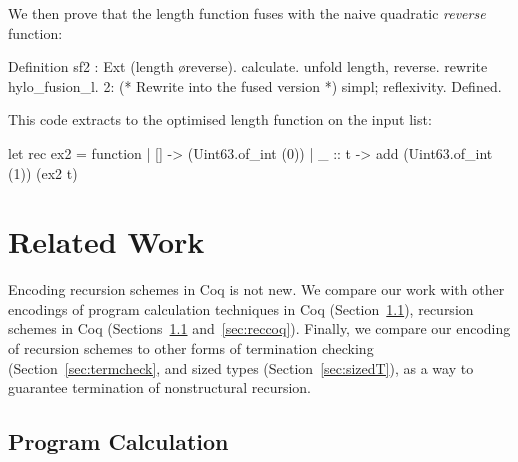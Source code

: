 \documentclass[ a4paper, UKenglish, cleveref, autoref, thm-restate]{lipics-v2021}
\begin{document}
We then prove that the length function fuses with
the naive quadratic \emph{reverse} function:
\begin{coqcode}
Definition sf2 : Ext (length \o reverse).
  calculate.  unfold length, reverse. rewrite hylo_fusion_l.
  2:{ (* Rewrite into the fused version *) }
  simpl; reflexivity.
Defined.
\end{coqcode}
This code extracts to the optimised length function on the input list:
\begin{ocamlcode}
let rec ex2 = function | [] -> (Uint63.of_int (0))
                       | _ :: t -> add (Uint63.of_int (1)) (ex2 t)
\end{ocamlcode}

\section{Related Work}
\label{sec:related-work}
%
Encoding recursion schemes in Coq is not new. We compare our work with other
encodings of program calculation techniques in Coq (Section~\ref{sec:calccoq}),
recursion schemes in Coq (Sections~\ref{sec:calccoq} and~\ref{sec:reccoq}).
Finally, we compare our encoding of recursion schemes to other forms of
termination checking (Section~\ref{sec:termcheck}, and sized types
(Section~\ref{sec:sizedT}), as a way to guarantee termination of nonstructural
recursion.


\subsection{Program Calculation}\label{sec:calccoq}
\end{document}
